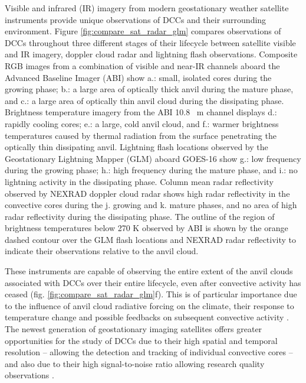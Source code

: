 Visible and infrared (IR) imagery from modern geostationary weather satellite instruments provide unique observations of DCCs and their surrounding environment.
Figure \ref{fig:compare_sat_radar_glm} compares observations of DCCs throughout three different stages of their lifecycle between satellite visible and IR imagery, doppler cloud radar and lightning flash observations.
Composite RGB images from a combination of visible and near-IR channels aboard the Advanced Baseline Imager (ABI) show a.: small, isolated cores during the growing phase; b.: a large area of optically thick anvil during the mature phase, and c.: a large area of optically thin anvil cloud during the dissipating phase.
Brightness temperature imagery from the ABI 10.8 \unit{\mu m} channel displays d.: rapidly cooling cores; e.: a large, cold anvil cloud, and f.: warmer brightness temperatures caused by thermal radiation from the surface penetrating the optically thin dissipating anvil. 
Lightning flash locations observed by the Geostationary Lightning Mapper (GLM) aboard GOES-16 show g.: low frequency during the growing phase; h.: high frequency during the mature phase, and i.: no lightning activity in the dissipating phase. 
Column mean radar reflectivity observed by NEXRAD doppler cloud radar shows high radar reflectivity in the convective cores during the j. growing and k. mature phases, and no area of high radar reflectivity during the dissipating phase. 
The outline of the region of brightness temperatures below 270 \unit{K} observed by ABI is shown by the orange dashed contour over the GLM flash locations and NEXRAD radar reflectivity to indicate their observations relative to the anvil cloud.

These instruments are capable of observing the entire extent of the anvil clouds associated with DCCs over their entire lifecycle, even after convective activity has ceased (fig. \ref{fig:compare_sat_radar_glm}f).
This is of particular importance due to the influence of anvil cloud radiative forcing on the climate, their response to temperature change \citep{bony_thermodynamic_2016, hartmann_tropical_2016, ceppi_cloud_2017, gasparini_what_2019} and possible feedbacks on subsequent convective activity \citep{varble_erroneous_2018}.
The newest generation of geostationary imaging satellites offers greater opportunities for the study of DCCs due to their high spatial and temporal resolution -- allowing the detection and tracking of individual convective cores \citep{heikenfeld_tobac_2019} -- and also due to their high signal-to-noise ratio allowing research quality observations \citep{iacovazzi_goes-16_2020}.

